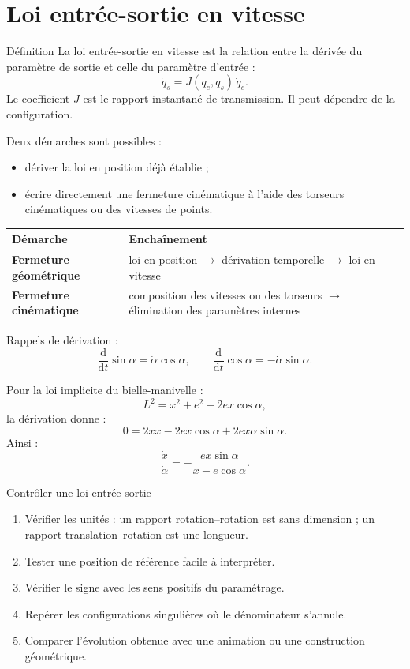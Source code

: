 \section{Loi entrée-sortie en vitesse}
\label{sec:les-vitesse}

\begin{TLThreeDef}{Définition}
La loi entrée-sortie en vitesse est la relation entre la dérivée du
paramètre de sortie et celle du paramètre d'entrée :
\[
\dot q_s=J(q_e,q_s)\,\dot q_e.
\]
Le coefficient $J$ est le rapport instantané de transmission. Il peut
dépendre de la configuration.
\end{TLThreeDef}

Deux démarches sont possibles :
\begin{itemize}
  \item dériver la loi en position déjà établie ;
  \item écrire directement une fermeture cinématique à l'aide des
  torseurs cinématiques ou des vitesses de points.
\end{itemize}

\begin{center}
\small
\begin{tabularx}{\linewidth}{>{\bfseries}p{3.5cm}X}
\toprule
Démarche & Enchaînement \\
\midrule
Fermeture géométrique & loi en position $\rightarrow$ dérivation temporelle $\rightarrow$ loi en vitesse \\
Fermeture cinématique & composition des vitesses ou des torseurs $\rightarrow$ élimination des paramètres internes \\
\bottomrule
\end{tabularx}
\end{center}

Rappels de dérivation :
\[
\frac{\mathrm d}{\mathrm dt}\sin\alpha
=\dot\alpha\cos\alpha,
\qquad
\frac{\mathrm d}{\mathrm dt}\cos\alpha
=-\dot\alpha\sin\alpha.
\]

Pour la loi implicite du bielle-manivelle :
\[
L^2=x^2+e^2-2ex\cos\alpha,
\]
la dérivation donne :
\[
0=2x\dot x-2e\dot x\cos\alpha
+2ex\dot\alpha\sin\alpha.
\]
Ainsi :
\[
\boxed{\frac{\dot x}{\dot\alpha}
=-\frac{ex\sin\alpha}{x-e\cos\alpha}.}
\]

\begin{TLThreeMethod}{Contrôler une loi entrée-sortie}
\begin{enumerate}
  \item Vérifier les unités : un rapport rotation--rotation est sans dimension ; un rapport translation--rotation est une longueur.
  \item Tester une position de référence facile à interpréter.
  \item Vérifier le signe avec les sens positifs du paramétrage.
  \item Repérer les configurations singulières où le dénominateur s'annule.
  \item Comparer l'évolution obtenue avec une animation ou une construction géométrique.
\end{enumerate}
\end{TLThreeMethod}

